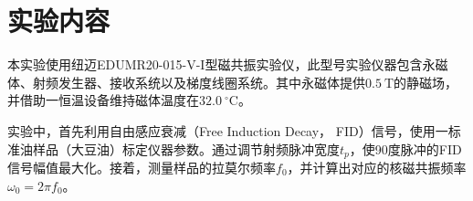 \documentclass{thuemp}
\begin{document}



\wuhao 


\section{实验内容}

本实验使用纽迈EDUMR20-015-V-I型磁共振实验仪，此型号实验仪器包含永磁体、射频发生器、接收系统以及梯度线圈系统。其中永磁体提供$0.5 ~ \text{T}$的静磁场，并借助一恒温设备维持磁体温度在$32.0 ~ ^\circ\text{C}$。

实验中，首先利用自由感应衰减（Free Induction Decay， FID）信号，使用一标准油样品（大豆油）标定仪器参数。通过调节射频脉冲宽度$t_p$，使90度脉冲的FID信号幅值最大化。接着，测量样品的拉莫尔频率$f_0$，并计算出对应的核磁共振频率$\omega_0 = 2\pi f_0$。
\end{document}
